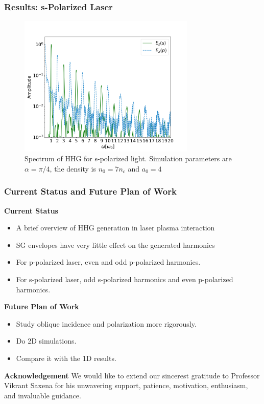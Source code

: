 \documentclass{beamer}
\begin{document}
\begin{frame}
    \frametitle{Results: s-Polarized Laser}
    \begin{figure}
        \centering
        \includegraphics[width=0.75\textwidth]{images/s_fft.png}
        \caption{\small{Spectrum of HHG for s-polarized light. Simulation parameters are $\alpha = \pi/4$, the density is $n_0 = 7n_c$ and $a_0 = 4$}}
    \end{figure}
\end{frame}

\begin{frame}
    \frametitle{Current Status and Future Plan of Work}
    \small
    \textbf{Current Status}
    \begin{itemize}
        \item A brief overview of HHG generation in laser plasma interaction
        \item SG envelopes have very little effect on the generated harmonics
        \item For p-polarized laser, even and odd p-polarized harmonics.
        \item For s-polarized laser, odd s-polarized harmonics and even p-polarized harmonics.
    \end{itemize}
    \textbf{Future Plan of Work}
    \begin{itemize}
        \item Study oblique incidence and polarization more rigorously.
        \item Do 2D simulations.
        \item Compare it with the 1D results.
    \end{itemize}
    \textbf{Acknowledgement}
    We would like to extend our sincerest gratitude to Professor Vikrant Saxena for his unwavering support, patience, motivation, enthusiasm, and invaluable guidance.
\end{frame}
\end{document}
